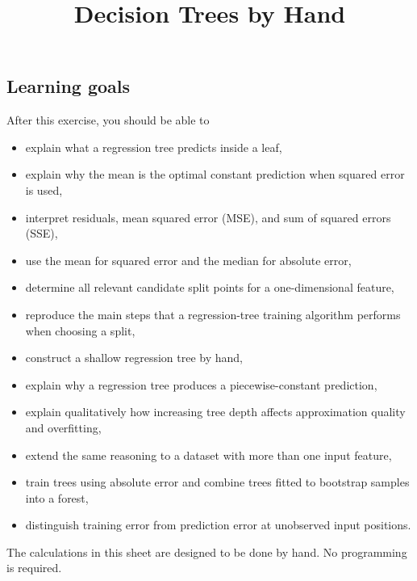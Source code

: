 \documentclass{course_sheet}
\begin{document}
\title{Decision Trees by Hand}
\author{}
\date{}
\maketitle
\subsection*{Learning goals}
After this exercise, you should be able to

\begin{itemize}
\item
explain what a regression tree predicts inside a leaf,

\item
explain why the mean is the optimal constant prediction when squared error is used,

\item
interpret residuals, mean squared error (MSE), and sum of squared errors (SSE),

\item
use the mean for squared error and the median for absolute error,

\item
determine all relevant candidate split points for a one-dimensional feature,

\item
reproduce the main steps that a regression-tree training algorithm performs when choosing a split,

\item
construct a shallow regression tree by hand,

\item
explain why a regression tree produces a piecewise-constant prediction,

\item
explain qualitatively how increasing tree depth affects approximation quality and overfitting,

\item
extend the same reasoning to a dataset with more than one input feature,

\item
train trees using absolute error and combine trees fitted to bootstrap samples into a forest,

\item
distinguish training error from prediction error at unobserved input positions.

\end{itemize}
The calculations in this sheet are designed to be done by hand. No programming is required.
\end{document}

